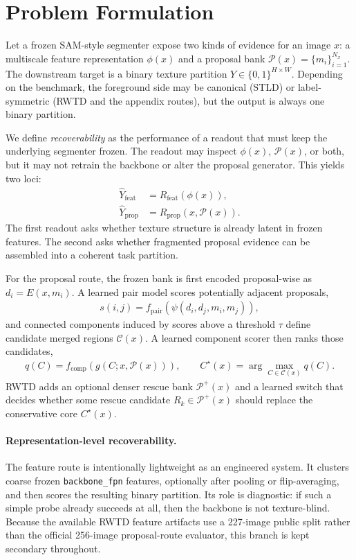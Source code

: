 \section{Problem Formulation}
\label{sec:problem}

Let a frozen SAM-style segmenter expose two kinds of evidence for an image $x$: a multiscale feature representation $\phi(x)$ and a proposal bank $\mathcal{P}(x)=\{m_i\}_{i=1}^{N_x}$. The downstream target is a binary texture partition $Y \in \{0,1\}^{H\times W}$. Depending on the benchmark, the foreground side may be canonical (STLD) or label-symmetric (RWTD and the appendix routes), but the output is always one binary partition.

We define \emph{recoverability} as the performance of a readout that must keep the underlying segmenter frozen. The readout may inspect $\phi(x)$, $\mathcal{P}(x)$, or both, but it may not retrain the backbone or alter the proposal generator. This yields two loci:
\begin{align}
\hat{Y}_{\mathrm{feat}} &= R_{\mathrm{feat}}(\phi(x)), \\
\hat{Y}_{\mathrm{prop}} &= R_{\mathrm{prop}}(x, \mathcal{P}(x)).
\end{align}
The first readout asks whether texture structure is already latent in frozen features. The second asks whether fragmented proposal evidence can be assembled into a coherent task partition.

For the proposal route, the frozen bank is first encoded proposal-wise as $d_i = E(x, m_i)$. A learned pair model scores potentially adjacent proposals,
\begin{align}
s(i,j) = f_{\mathrm{pair}}(\psi(d_i, d_j, m_i, m_j)),
\end{align}
and connected components induced by scores above a threshold $\tau$ define candidate merged regions $\mathcal{C}(x)$. A learned component scorer then ranks those candidates,
\begin{align}
q(C) = f_{\mathrm{comp}}(g(C; x, \mathcal{P}(x))), \qquad
C^\star(x) = \arg\max_{C \in \mathcal{C}(x)} q(C).
\end{align}
RWTD adds an optional denser rescue bank $\mathcal{P}^{+}(x)$ and a learned switch that decides whether some rescue candidate $R_k \in \mathcal{P}^{+}(x)$ should replace the conservative core $C^\star(x)$.

\paragraph{Representation-level recoverability.} The feature route is intentionally lightweight as an engineered system. It clusters coarse frozen \texttt{backbone\_fpn} features, optionally after pooling or flip-averaging, and then scores the resulting binary partition. Its role is diagnostic: if such a simple probe already succeeds at all, then the backbone is not texture-blind. Because the available RWTD feature artifacts use a 227-image public split rather than the official 256-image proposal-route evaluator, this branch is kept secondary throughout.

